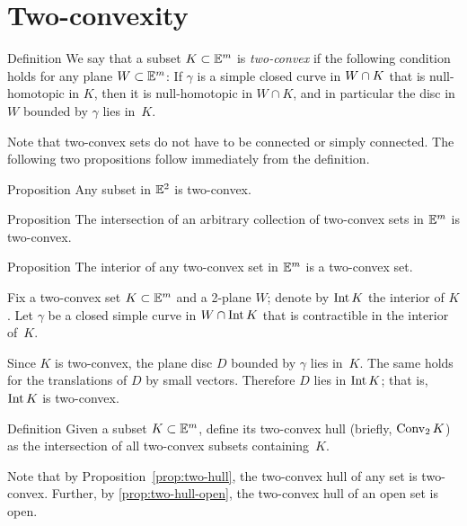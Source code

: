\section{Two-convexity}

\begin{thm}{Definition}\label{def:two-convex}
We say that a subset $K\subset \mathbb{E}^m$ is \emph{two-convex}
if the following condition holds for any plane $W\subset\mathbb{E}^m$:
If $\gamma$ is a simple closed curve in $W\z\cap K$
that is null-homotopic in $K$,  
then it is null-homotopic in $W\cap K$, and in particular the disc in $W$ bounded by $\gamma$ lies in~$K$.
\end{thm}

Note that two-convex sets do not have to be connected or simply connected. 
The following two propositions follow immediately from the definition.

\begin{thm}{Proposition}
Any subset in $\mathbb{E}^2$ is two-convex.
\end{thm}

\begin{thm}{Proposition}\label{prop:two-hull}
The intersection of an arbitrary collection of two-convex sets in $\mathbb{E}^m$ is two-convex.
\end{thm}

\begin{thm}{Proposition}\label{prop:two-hull-open}
The interior of any two-convex set in $\mathbb{E}^m$ is a two-convex set.
\end{thm}

Fix a  two-convex set $K\subset \mathbb{E}^m$ and a 2-plane $W$;
denote by $\operatorname{\rm Int}\nolimits K$ the interior of $K$.
Let $\gamma$ be a closed simple curve in $W\cap \operatorname{\rm Int}\nolimits K$ 
that  is contractible in the interior of~$K$.

Since $K$ is two-convex,
the plane disc $D$ bounded by $\gamma$ lies in~$K$.
The same holds for the translations of $D$ by small vectors.
Therefore $D$ lies in $\operatorname{\rm Int}\nolimits K$;
that is, $\operatorname{\rm Int}\nolimits K$ is two-convex.
\qeds

\begin{thm}{Definition}
Given a subset $K\subset \mathbb{E}^m$, define its two-convex hull (briefly, $\mathop{\rm Conv}\nolimits_2K$) as the intersection of all two-convex subsets containing~$K$.
\end{thm}

Note that by Proposition~\ref{prop:two-hull},
the two-convex hull of any set is two-convex.
Further, 
by \ref{prop:two-hull-open}, the
two-convex hull of an open set is open.

